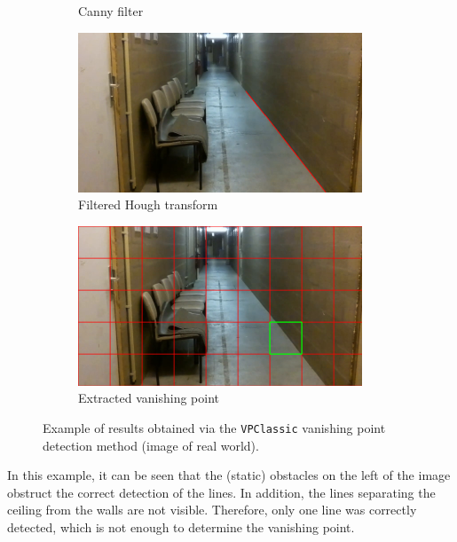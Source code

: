 \begin{figure}[t]
\begin{subfigure}{0.49\textwidth}
        \caption{Canny filter}
        \vspace{0.5em}
    \end{subfigure}
    \begin{subfigure}{0.49\textwidth}
        \centering
        \includegraphics[width=\textwidth]{resources/png/07/vanishing-point/vpclassic/2.png}
        \caption{Filtered Hough transform}
    \end{subfigure}
    \hfill
    \begin{subfigure}{0.49\textwidth}
        \centering
        \includegraphics[width=\textwidth]{resources/png/07/vanishing-point/vpclassic/3.png}
        \caption{Extracted vanishing point}
    \end{subfigure}
    \caption{Example of results obtained via the \texttt{VPClassic} vanishing point detection method (image of real world).}
    \label{fig:07.vpclassic.example}
\end{figure}

In this example, it can be seen that the (static) obstacles on the left of the image obstruct the correct detection of the lines. In addition, the lines separating the ceiling from the walls are not visible. Therefore, only one line was correctly detected, which is not enough to determine the vanishing point.

